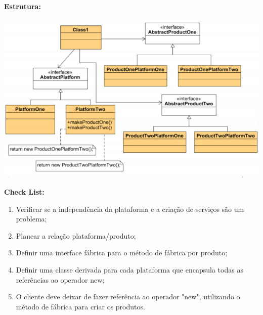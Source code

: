 \documentclass{article}
\begin{document}
\begin{flushleft}
    \textbf{Estrutura:}

    \begin{center}
        \includegraphics[scale=0.4]{Images/27.png}
    \end{center}
\end{flushleft}

\begin{flushleft}
    \textbf{Check List:}

    \begin{enumerate}
        \item Verificar se a independência da plataforma e a criação de serviços são um
        problema;
        \item  Planear a relação plataforma/produto;
        \item Definir uma interface fábrica para o método de fábrica por produto;
        \item Definir uma classe derivada para cada plataforma que encapsula todas as
        referências ao operador new;
        \item O cliente deve deixar de fazer referência ao operador "new", utilizando o
        método de fábrica para criar os produtos.
    \end{enumerate}
\end{flushleft}
\end{document}
